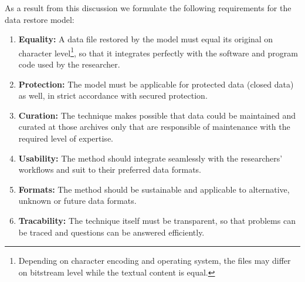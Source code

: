 \documentclass{acm_proc_article-sp}
\begin{document}
As a result from this discussion we formulate the following requirements for the data restore model:



\begin{enumerate}\label{reqlist}
	
  \item \textbf{Equality:} A data file restored by the model must equal its original on character level\footnote{Depending on character encoding and operating system, the files may differ on bitstream level while the textual content is equal.}, so that it integrates perfectly with the software and program code used by the researcher.
  
  \item \textbf{Protection:} The model must be applicable for protected data (closed data) as well, in strict accordance with secured protection.
 
  \item \textbf{Curation:} The technique makes possible that data could be maintained and curated at those archives only that are responsible of maintenance with the required level of expertise.
  
  \item \textbf{Usability:} The method should integrate seamlessly with the researchers' workflows and suit to their preferred data formats. 
  
  \item \textbf{Formats:} The method should be sustainable and applicable to alternative, unknown or future data formats.

  \item \textbf{Tracability:} The technique itself must be transparent, so that problems can be traced and questions can be answered efficiently.
 

\end{enumerate}
\end{document}
